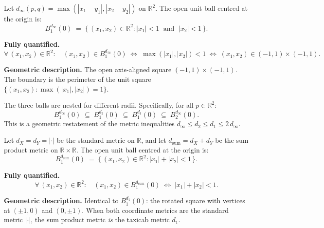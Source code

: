 \begin{tcolorbox}[colback=propbox, colframe=propborder, arc=2pt,
  left=6pt, right=6pt, top=4pt, bottom=4pt,
  title={\small\textbf{Unit Ball: Maximum Metric $d_\infty$ on $\mathbb{R}^2$}},
  fonttitle=\small\bfseries]
\begin{definition}
\label{def:ball-dinf}
Let $d_\infty(p,q) = \max(|x_1-y_1|,|x_2-y_2|)$ on $\mathbb{R}^2$.
The open unit ball centred at the origin is:
\[
B_1^{d_\infty}(0)
\;=\; \bigl\{\,(x_1,x_2)\in\mathbb{R}^2 :
|x_1| < 1 \;\text{ and }\; |x_2| < 1\,\bigr\}.
\]

\medskip
\noindent\textbf{Fully quantified.}
\[
\forall\,(x_1,x_2)\in\mathbb{R}^2:\quad
(x_1,x_2)\in B_1^{d_\infty}(0)
\;\iff\;
\max(|x_1|,|x_2|) < 1
\;\iff\;
(x_1,x_2)\in(-1,1)\times(-1,1).
\]

\medskip
\noindent\textbf{Geometric description.}
The open axis-aligned square $(-1,1)\times(-1,1)$.
The boundary is the perimeter of the unit square
$\{(x_1,x_2): \max(|x_1|,|x_2|)=1\}$.
\end{definition}
\end{tcolorbox}

\begin{remark*}
The three balls are nested for different radii.
Specifically, for all $p \in \mathbb{R}^2$:
\[
B_1^{d_\infty}(0)\;\subseteq\;B_1^{d_2}(0)\;\subseteq\;B_1^{d_1}(0)
\;\subseteq\;B_2^{d_\infty}(0).
\]
This is a geometric restatement of the metric inequalities
$d_\infty \le d_2 \le d_1 \le 2\,d_\infty$.
\end{remark*}


\begin{tcolorbox}[colback=propbox, colframe=propborder, arc=2pt,
  left=6pt, right=6pt, top=4pt, bottom=4pt,
  title={\small\textbf{Unit Ball: Product Metric (Standard $\times$ Standard)}},
  fonttitle=\small\bfseries]
\begin{definition}
\label{def:ball-std-std}
Let $d_X = d_Y = |\cdot|$ be the standard metric on $\mathbb{R}$,
and let $d_{\mathrm{sum}} = d_X + d_Y$ be the sum product metric on
$\mathbb{R}\times\mathbb{R}$.
The open unit ball centred at the origin is:
\[
B_1^{d_{\mathrm{sum}}}(0)
\;=\; \bigl\{\,(x_1,x_2)\in\mathbb{R}^2 :
|x_1| + |x_2| < 1\,\bigr\}.
\]

\medskip
\noindent\textbf{Fully quantified.}
\[
\forall\,(x_1,x_2)\in\mathbb{R}^2:\quad
(x_1,x_2)\in B_1^{d_{\mathrm{sum}}}(0)
\;\iff\;
|x_1|+|x_2| < 1.
\]

\medskip
\noindent\textbf{Geometric description.}
Identical to $B_1^{d_1}(0)$: the rotated square with vertices at
$(\pm 1,0)$ and $(0,\pm 1)$.
When both coordinate metrics are the standard metric $|\cdot|$,
the sum product metric \emph{is} the taxicab metric $d_1$.
\end{definition}
\end{tcolorbox}

